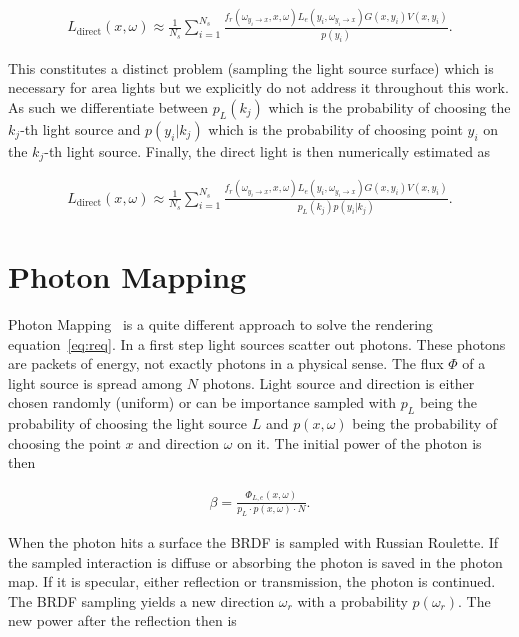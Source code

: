 \begin{align}
L_{\text{direct}}(x, \omega) \approx \frac{1}{N_s} \sum_{i=1}^{N_s} \frac{f_r(\omega_{y_i \rightarrow x}, x, \omega) L_e(y_i, \omega_{y_i \rightarrow x}) G(x,y_i)V(x,y_i)}{p(y_i)}.
\end{align}

This constitutes a distinct problem (sampling the light source surface) which is necessary for area lights but we explicitly do not address it throughout this work. As such we differentiate between $p_L(k_j)$ which is the probability of choosing the $k_j$-th light source and $p(y_i|k_j)$ which is the probability of choosing point $y_i$ on the $k_j$-th light source. Finally, the direct light is then numerically estimated as

\begin{align}
L_{\text{direct}}(x, \omega) \approx \frac{1}{N_s} \sum_{i=1}^{N_s} \frac{f_r(\omega_{y_i \rightarrow x}, x, \omega) L_e(y_i, \omega_{y_i \rightarrow x}) G(x,y_i)V(x,y_i)}{p_L(k_j)p(y_i|k_j)}.
\end{align}


\section{Photon Mapping}
\label{sec:PM}
Photon Mapping~\parencite{jensen2001realistic, DBLP:journals/cg/JensenC95} is a quite different approach to solve the rendering equation~\ref{eq:req}. In a first step light sources scatter out photons. These photons are packets of energy, not exactly photons in a physical sense. The flux $\Phi$ of a light source is spread among $N$ photons. Light source and direction is either chosen randomly (uniform) or can be importance sampled with $p_L$ being the probability of choosing the light source $L$ and $p(x,\omega)$ being the probability of choosing the point $x$ and direction $\omega$ on it. The initial power of the photon is then

\begin{align}
\beta = \frac{\Phi_{L,e}(x,\omega)}{p_L \cdot p(x,\omega) \cdot N}.
\end{align}

When the photon hits a surface the BRDF is sampled with Russian Roulette. If the sampled interaction is diffuse or absorbing the photon is saved in the photon map. If it is specular, either reflection or transmission, the photon is continued. The BRDF sampling yields a new direction $\omega_r$ with a probability $p(\omega_r)$. The new power after the reflection then is

